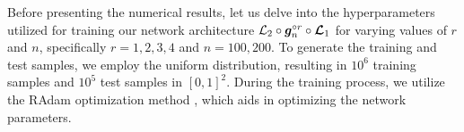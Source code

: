 \documentclass[nohyperref]{article}
\theoremstyle{plain}
\theoremstyle{definition}
\theoremstyle{remark}
\begin{document}
Before presenting the numerical results, let us delve into the hyperparameters utilized for training our network architecture ${\mathcal{L}}_2\circ {\bm{g}}_n^{\circ r}\circ {\bm{\mathcal{L}}}_1$ for varying values of $r$ and $n$, specifically $r=1,2,3,4$ and $n=100,200$.
To generate the training and test samples, we employ the uniform distribution, resulting in $10^6$ training samples and $10^5$ test samples in $[0,1]^2$.
During the training process, we utilize the RAdam optimization method \cite{Liu2020On}, which aids in optimizing the network parameters.
\end{document}
